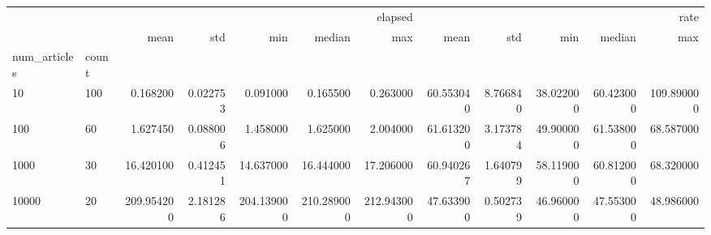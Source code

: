 \begin{tabular}{llrrrrrrrrrr}
 &  & \multicolumn{5}{r}{elapsed} & \multicolumn{5}{r}{rate} \\
 &  & mean & std & min & median & max & mean & std & min & median & max \\
num_articles & count &  &  &  &  &  &  &  &  &  &  \\
10 & 100 & 0.168200 & 0.022753 & 0.091000 & 0.165500 & 0.263000 & 60.553040 & 8.766840 & 38.022000 & 60.423000 & 109.890000 \\
100 & 60 & 1.627450 & 0.088006 & 1.458000 & 1.625000 & 2.004000 & 61.613200 & 3.173784 & 49.900000 & 61.538000 & 68.587000 \\
1000 & 30 & 16.420100 & 0.412451 & 14.637000 & 16.444000 & 17.206000 & 60.940267 & 1.640799 & 58.119000 & 60.812000 & 68.320000 \\
10000 & 20 & 209.954200 & 2.181286 & 204.139000 & 210.289000 & 212.943000 & 47.633900 & 0.502739 & 46.960000 & 47.553000 & 48.986000 \\
\end{tabular}
